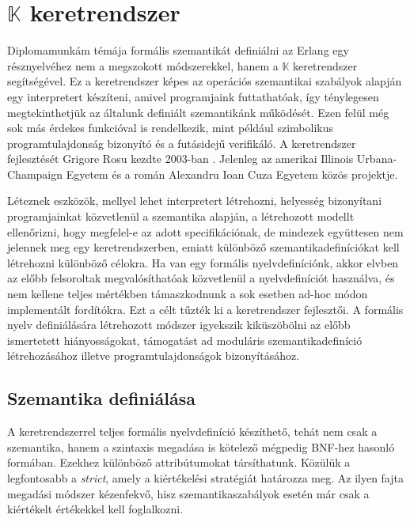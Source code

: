 \section{$\mathbb{K}$ keretrendszer}

Diplomamunkám témája formális szemantikát definiálni az Erlang egy résznyelvéhez nem a megszokott módszerekkel, hanem a $\mathbb{K}$ keretrendszer \cite{KOrg} segítségével. Ez a keretrendszer képes az operációs szemantikai szabályok alapján egy interpretert készíteni, amivel programjaink futtathatóak, így ténylegesen megtekinthetjük az általunk definiált szemantikánk működését. Ezen felül még sok más érdekes funkcióval is rendelkezik, mint például szimbolikus programtulajdonság bizonyító és a futásidejű verifikáló. A keretrendszer fejlesztését Grigore Rosu kezdte 2003-ban \cite{KLecture}. Jelenleg az amerikai Illinois Urbana-Champaign Egyetem és a román Alexandru Ioan Cuza Egyetem közös projektje.

Léteznek eszközök, mellyel lehet interpretert létrehozni, helyesség bizonyítani programjainkat közvetlenül a szemantika alapján, a létrehozott modellt ellenőrizni, hogy megfelel-e az adott specifikációnak, de mindezek együttesen nem jelennek meg egy keretrendszerben, emiatt különböző szemantikadefiníciókat kell létrehozni különböző célokra. Ha van egy formális nyelvdefiníciónk, akkor elvben az előbb felsoroltak megvalósíthatóak közvetlenül a nyelvdefiníciót használva, és nem kellene teljes mértékben támaszkodnunk a sok esetben ad-hoc módon implementált fordítókra. Ezt a célt tűzték ki a keretrendszer fejlesztői. A formális nyelv definiálására létrehozott módszer igyekszik kiküszöbölni az előbb ismertetett hiányosságokat, támogatást ad moduláris szemantikadefiníció létrehozásához illetve programtulajdonságok bizonyításához.

\subsection{Szemantika definiálása}

A keretrendszerrel teljes formális nyelvdefiníció készíthető, tehát nem csak a szemantika, hanem a szintaxis megadása is kötelező mégpedig BNF-hez hasonló formában. Ezekhez különböző attribútumokat társíthatunk. Közülük a legfontosabb a \textit{strict}, amely a kiértékelési stratégiát határozza meg. Az ilyen fajta megadási módszer kézenfekvő, hisz szemantikaszabályok esetén már csak a kiértékelt értékekkel kell foglalkozni.



